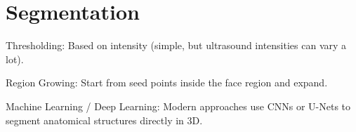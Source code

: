 \chapter{Segmentation}


Thresholding: Based on intensity (simple, but ultrasound intensities can vary a lot).

Region Growing: Start from seed points inside the face region and expand.

Machine Learning / Deep Learning: Modern approaches use CNNs or U-Nets to segment anatomical structures directly in 3D.
